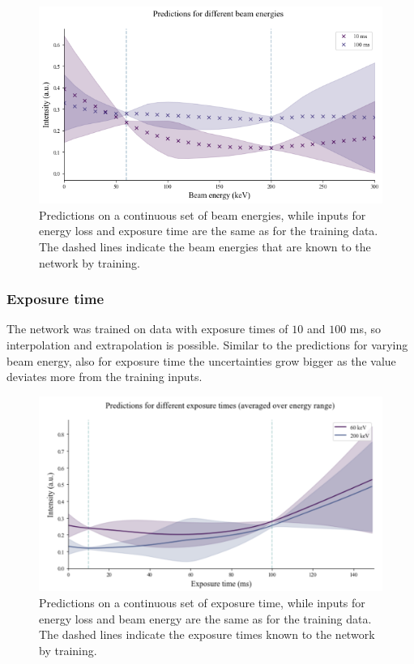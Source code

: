 \begin{figure}[H]
    \centering
    \includegraphics[width=120mm]{plots/Extrapolate_beamenergy.png}
    \caption{Predictions on a continuous set of beam energies, while inputs for energy loss and exposure time are the same as for the training data. The dashed lines indicate the beam energies that are known to the network by training.}
    \label{fig:extrapolbeam}
\end{figure}

\subsubsection{Exposure time}
\label{sec:texp}
The network was trained on data with exposure times of $10$ and $100$ ms, so interpolation and extrapolation is possible. Similar to the predictions for varying beam energy, also for exposure time the uncertainties grow bigger as the value deviates more from the training inputs.

\begin{figure}[H]
    \centering
    \includegraphics[width=120mm]{plots/Extrapolate_exposuretime.png}
    \caption{Predictions on a continuous set of exposure time, while inputs for energy loss and beam energy are the same as for the training data. The dashed lines indicate the exposure times known to the network by training.}
    \label{fig:extrapolbeam}
\end{figure}
